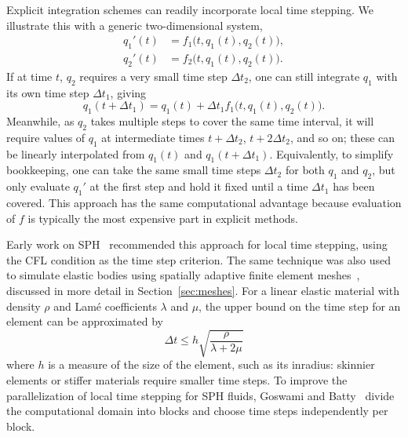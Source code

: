 Explicit integration schemes can readily incorporate local time stepping.
We illustrate this with a generic two-dimensional system,
\begin{align}
  q_1'(t) &= f_1\big(t, q_1(t), q_2(t)\big), \\
  q_2'(t) &= f_2\big(t, q_1(t), q_2(t)\big).
\end{align}
If at time $t$, $q_2$ requires a very small time step $\Delta t_2$, one can still integrate $q_1$ with its own time step $\Delta t_1$, giving
\begin{equation}
  q_1(t+\Delta t_1) = q_1(t) + \Delta t_1 f_1\big(t, q_1(t), q_2(t)\big).
\end{equation}
Meanwhile, as $q_2$ takes multiple steps to cover the same time interval, it will require values of $q_1$ at intermediate times $t+\Delta t_2$, $t+2\Delta t_2$, and so on; these can be linearly interpolated from $q_1(t)$ and $q_1(t+\Delta t_1)$.
Equivalently, to simplify bookkeeping, one can take the same small time steps $\Delta t_2$ for both $q_1$ and $q_2$, but only evaluate $q_1'$ at the first step and hold it fixed until a time $\Delta t_1$ has been covered.
This approach has the same computational advantage because evaluation of $f$ is typically the most expensive part in explicit methods.

Early work on SPH~\cite{Desbrun1996,Desbrun1999} recommended this approach for local time stepping, using the CFL condition as the time step criterion.
The same technique was also used to simulate elastic bodies using spatially adaptive finite element meshes~\cite{Debunne2001}, discussed in more detail in Section~\ref{sec:meshes}.
For a linear elastic material with density $\rho$ and Lam\'e coefficients $\lambda$ and $\mu$, the upper bound on the time step for an element can be approximated by
\begin{equation}
  \label{eq:cfl-fem}
  \Delta t \le h\sqrt{\frac\rho{\lambda+2\mu}}
\end{equation}
where $h$ is a measure of the size of the element, such as its inradius: skinnier elements or stiffer materials require smaller time steps.
To improve the parallelization of local time stepping for SPH fluids, Goswami and Batty~\cite{Goswami2014} divide the computational domain into blocks and choose time steps independently per block.
